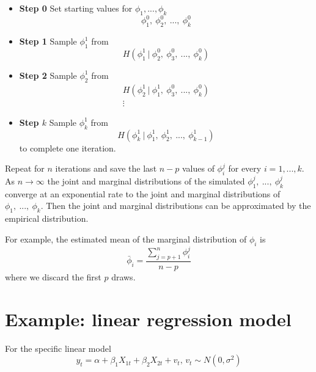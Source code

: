 \documentclass[
  letterpaper,
]{book}
\begin{document}
\begin{itemize}
\item
  \textbf{Step 0} Set starting values for \(\phi_1,...,\phi_k\) \[
    \phi_1^0,\ \phi_2^0,\ ...,\ \phi_k^0
  \]
\item
  \textbf{Step 1} Sample \(\phi_1^1\) from \[
     H(\phi_1^1\ |\ \phi_2^0,\ \phi_3^0,\ ...,\ \phi_k^0) 
  \]
\item
  \textbf{Step 2} Sample \(\phi_2^1\) from \[    
    \begin{gather*}
    H(\phi_2^1\ |\ \phi_1^1,\ \phi_3^0,\ ...,\ \phi_k^0)  \\
    \vdots 
    \end{gather*}
  \]
\item
  \textbf{Step \(k\)} Sample \(\phi_k^1\) from \[
    H(\phi_k^1\ |\ \phi_1^1,\ \phi_2^1,\ ...,\ \phi_{k-1}^1) 
  \] to complete one iteration.
\end{itemize}

Repeat for \(n\) iterations and save the last \(n-p\) values of
\(\phi_i^j\) for every \(i=1,...,k\). As \(n \rightarrow \infty\) the
joint and marginal distributions of the simulated
\(\phi_1^j,\ ...,\ \phi_k^j\) converge at an exponential rate to the
joint and marginal distributions of \(\phi_1,\ ...,\ \phi_k\). Then the
joint and marginal distributions can be approximated by the empirical
distribution.

For example, the estimated mean of the marginal distribution of
\(\phi_i\) is \[
   \bar \phi_i = \frac{\sum_{j=p+1}^n \phi_i^j}{n-p}
\] where we discard the first \(p\) draws.

\hypertarget{example-linear-regression-model}{%
\chapter{Example: linear regression
model}\label{example-linear-regression-model}}

For the specific linear model \[
   y_t = \alpha + \beta_1 X_{1t} + \beta_2 X_{2t}+v_t\text{, }v_t\sim N(0,\sigma^2)
\]
\end{document}
